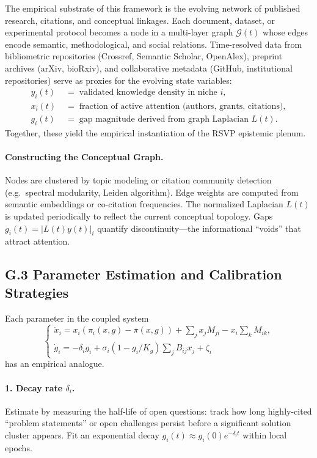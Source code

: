 \documentclass[11pt,a4paper,titlepage]{article}
\theoremstyle{definition}
\begin{document}
\begin{itemize}
The empirical substrate of this framework is the evolving network of published research, citations, and conceptual linkages.  Each document, dataset, or experimental protocol becomes a node in a multi-layer graph $\mathcal{G}(t)$ whose edges encode semantic, methodological, and social relations.  Time-resolved data from bibliometric repositories (Crossref, Semantic Scholar, OpenAlex), preprint archives (arXiv, bioRxiv), and collaborative metadata (GitHub, institutional repositories) serve as proxies for the evolving state variables:
\begin{align*}
y_i(t) &\;=\; \text{validated knowledge density in niche $i$},\\
x_i(t) &\;=\; \text{fraction of active attention (authors, grants, citations)},\\
g_i(t) &\;=\; \text{gap magnitude derived from graph Laplacian $L(t)$}.
\end{align*}
Together, these yield the empirical instantiation of the RSVP epistemic plenum.

\paragraph{Constructing the Conceptual Graph.}
Nodes are clustered by topic modeling or citation community detection (e.g.\ spectral modularity, Leiden algorithm).
Edge weights are computed from semantic embeddings or co-citation frequencies.
The normalized Laplacian $L(t)$ is updated periodically to reflect the current conceptual topology.
Gaps $g_i(t)=|L(t)y(t)|_i$ quantify discontinuity---the informational ``voids'' that attract attention.

\subsection*{G.3 Parameter Estimation and Calibration Strategies}

Each parameter in the coupled system
\[
\begin{cases}
\dot{x}_i = x_i(\pi_i(x,g)-\bar\pi(x,g)) + \sum_j x_jM_{ji} - x_i\sum_k M_{ik},\\[3pt]
\dot{g}_i = -\delta_i g_i + \sigma_i(1-g_i/K_g)\sum_j B_{ij}x_j + \zeta_i
\end{cases}
\]
has an empirical analogue.

\paragraph{1. Decay rate $\delta_i$.}
Estimate by measuring the half-life of open questions:
track how long highly-cited ``problem statements'' or open challenges persist before a significant solution cluster appears.  
Fit an exponential decay $g_i(t)\!\approx\! g_i(0)e^{-\delta_i t}$ within local epochs.


\end{itemize}
\end{document}

